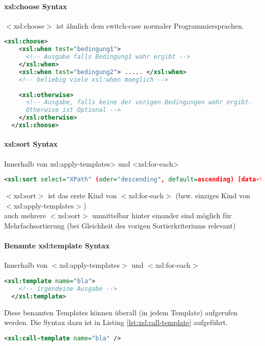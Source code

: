 \paragraph{xsl:choose Syntax}
$<$xsl:choose$>$ ist ähnlich dem switch-case normaler Programmiersprachen.
\begin{lstlisting}[caption={xsl:choose Syntax}, label={lst:xsl:choose}, language={XML}]
  <xsl:choose>
    <xsl:when test="bedingung1">
      <!-- Ausgabe falls Bedingung1 wahr ergibt -->
    </xsl:when>
    <xsl:when test="bedingung2"> ..... </xsl:when>
    <!-- beliebig viele xsl:when moeglich -->
    
    <xsl:otherwise>
      <!-- Ausgabe, falls keine der vorigen Bedingungen wahr ergibt.
      Otherwise ist Optional -->
    </xsl:otherwise>    
  </xsl:choose>
\end{lstlisting}


\paragraph{xsl:sort Syntax}
Innerhalb von xsl:apply-templates> und <xsl:for-each>
\begin{lstlisting}[caption={xsl:sort Syntax}, label={lst:xsl:sort}, language={XML}]
  <xsl:sort select="XPath" (oder="descending", default=ascending) [data-type="number" (default=text)] />
\end{lstlisting}
$<$xsl:sort$>$ ist das erste Kind von $<$xsl:for-each$>$ (bzw. einziges Kind von $<$xsl:apply-templates$>$)\\
auch mehrere $<$xsl:sort$>$ unmittelbar hinter einander sind möglich für Mehrfachsortierung (bei Gleichheit des vorigen Sortierkriteriums relevant)

\paragraph{Benamte xsl:template Syntax}
Innerhalb von $<$xsl:apply-templates$>$ und $<$xsl:for-each$>$
\begin{lstlisting}[caption={xsl:template mit name Syntax}, label={lst:xsl:template_with_name}, language={XML}]
  <xsl:template name="bla">
    <!-- irgendeine Ausgabe -->
  </xsl:template>
\end{lstlisting}
Diese benamten Templates können überall (in jedem Template) aufgerufen werden. Die Syntax dazu ist in Listing \vref{lst:xsl:call-template} aufgeführt.\\
\begin{lstlisting}[caption={xsl:call-template Syntax}, label={lst:xsl:call-template}, language={XML}]
  <xsl:call-template name="bla" />
\end{lstlisting}

